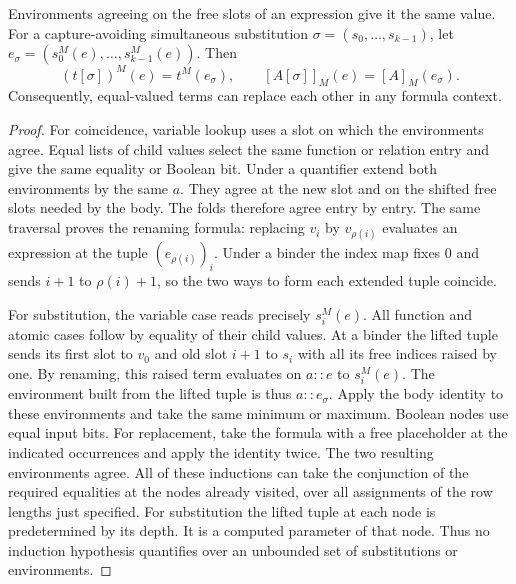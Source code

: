 \begin{lemma}\label{lem:semsub}
Environments agreeing on the free slots of an expression give it the same value. For a capture-avoiding simultaneous substitution $\sigma=(s_0,\ldots,s_{k-1})$, let $e_\sigma=(s_0^M(e),\ldots,s_{k-1}^M(e))$. Then
\[
 (t[\sigma])^M(e)=t^M(e_\sigma),\qquad
 [A[\sigma]]_M(e)=[A]_M(e_\sigma).
\]
Consequently, equal-valued terms can replace each other in any formula context.
\end{lemma}
\begin{proof}
For coincidence, variable lookup uses a slot on which the environments agree. Equal lists of child values select the same function or relation entry and give the same equality or Boolean bit. Under a quantifier extend both environments by the same $a$. They agree at the new slot and on the shifted free slots needed by the body. The folds therefore agree entry by entry. The same traversal proves the renaming formula: replacing $v_i$ by $v_{\rho(i)}$ evaluates an expression at the tuple $(e_{\rho(i)})_i$. Under a binder the index map fixes $0$ and sends $i+1$ to $\rho(i)+1$, so the two ways to form each extended tuple coincide.

For substitution, the variable case reads precisely $s_i^M(e)$. All function and atomic cases follow by equality of their child values. At a binder the lifted tuple sends its first slot to $v_0$ and old slot $i+1$ to $s_i$ with all its free indices raised by one. By renaming, this raised term evaluates on $a::e$ to $s_i^M(e)$. The environment built from the lifted tuple is thus $a::e_\sigma$. Apply the body identity to these environments and take the same minimum or maximum. Boolean nodes use equal input bits. For replacement, take the formula with a free placeholder at the indicated occurrences and apply the identity twice. The two resulting environments agree. All of these inductions can take the conjunction of the required equalities at the nodes already visited, over all assignments of the row lengths just specified. For substitution the lifted tuple at each node is predetermined by its depth. It is a computed parameter of that node. Thus no induction hypothesis quantifies over an unbounded set of substitutions or environments.
\end{proof}

